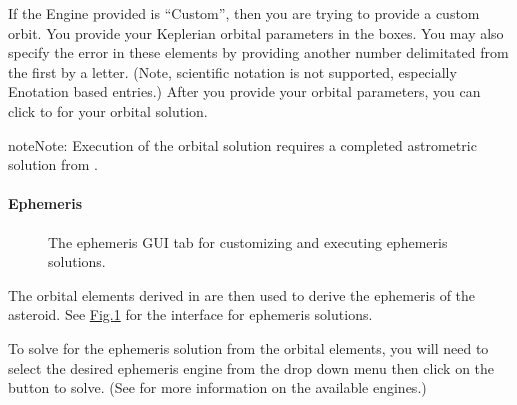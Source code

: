 \documentclass[letterpaper,11pt,english]{sphinxmanual}
\begin{document}
\sphinxAtStartPar
If the Engine provided is “Custom”, then you are trying to provide a custom
orbit. You provide your Keplerian orbital parameters in the boxes. You may also
specify the error in these elements by providing another number delimitated
from the first by a letter. (Note, scientific notation is not supported,
especially E\sphinxhyphen{}notation based entries.) After you provide your orbital parameters,
you can click  to  for your orbital solution.

\begin{sphinxadmonition}{note}{Note:}
\sphinxAtStartPar
Execution of the orbital solution requires a completed astrometric
solution from
{\hyperref[\detokenize{user/manual_mode:user-manual-mode-procedure-find-asteroid-location-compute-astrometric-solution}]{}}.
\end{sphinxadmonition}


\paragraph{Ephemeris}
\label{\detokenize{user/manual_mode:ephemeris}}\label{\detokenize{user/manual_mode:user-manual-mode-procedure-ephemeris}}
\begin{figure}[htbp]
\centering
\capstart

\noindent{}
\caption{The ephemeris GUI tab for customizing and executing ephemeris solutions.}\label{\detokenize{user/manual_mode:id9}}\label{\detokenize{user/manual_mode:figure-manual-mode-gui-ephemeris}}\end{figure}

\sphinxAtStartPar
The orbital elements derived in {\hyperref[\detokenize{user/manual_mode:user-manual-mode-procedure-orbital-elements}]{}}
are then used to derive the ephemeris of the asteroid. See
\hyperref[\detokenize{user/manual_mode:figure-manual-mode-gui-ephemeris}]{Fig.\@ \ref{\detokenize{user/manual_mode:figure-manual-mode-gui-ephemeris}}} for the interface for ephemeris
solutions.

\sphinxAtStartPar
To solve for the ephemeris solution from the orbital elements, you will need to
select the desired ephemeris engine from the drop down menu then click on the
 button to solve.
(See {\hyperref[\detokenize{technical/architecture/services_engines:technical-architecture-services-engines}]{}} for more information on
the available engines.)
\end{document}
